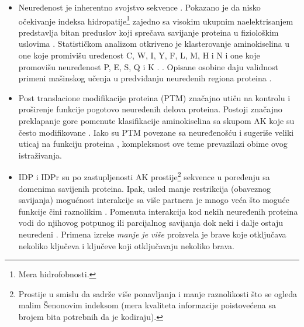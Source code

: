 \begin{itemize}

  \item
    Neuređenost je inherentno svojstvo sekvence \parencite{dunker2001}.
    Pokazano je da nisko očekivanje indeksa hidropatije\footnote{Mera hidrofobnosti.} zajedno sa visokim
    ukupnim naelektrisanjem predstavlja bitan preduslov koji sprečava savijanje
    proteina u fiziološkim uslovima \parencite{uversky2016}. Statističkom
    analizom otkriveno je klasterovanje aminokiselina u one koje promivišu
    uređenost C, W, I, Y, F, L, M, H i N  i one koje
    promovišu neuređenost P, E, S, Q i K .
    \parencite{uversky2016, oldfield2014}. Opisane osobine daju validnost
    primeni mašinskog učenja u predviđanju neuređenih regiona proteina
    \parencite{oldfield2014}.

  \item
    Post translacione modifikacije proteina (PTM) značajno utiču na  kontrolu i
    proširenje funkcije pogotovo neuređenih delova proteina. Postoji značajno
    preklapanje gore pomenute klasifikacije aminokiselina sa skupom AK koje su
    često modifikovane \parencite{uversky2016}. Iako su PTM povezane sa
    neuređenošću i sugeriše veliki uticaj na funkciju proteina
    \parencite{uversky2016}, kompleksnost ove teme prevazilazi obime ovog
    istraživanja.


  \item
    IDP i IDPr su po zastupljenosti AK prostije\footnote{Prostije u smislu da
      sadrže više ponavljanja i manje raznolikosti što se ogleda malim Šenonovim indeksom (mera kvaliteta
    informacije poistovećena sa brojem bita potrebnih da je kodiraju).}
    sekvence u poređenju sa domenima savijenih proteina. Ipak, usled manje
    restrikcija (obaveznog savijanja) mogućnost interakcije sa više partnera je
    mnogo veća što moguće funkcije čini raznolikim \parencite{uversky2016}.
    Pomenuta interakcija kod nekih neuređenih proteina vodi do njihovog
    potpunog ili parcijalnog savijanja dok neki i dalje ostaju neuređeni
    \parencite{uversky2016}.  Primena izreke \textit{manje je više} proizvela
    je brave koje otključava nekoliko ključeva i ključeve koji otključavaju
    nekoliko brava.


\end{itemize}
